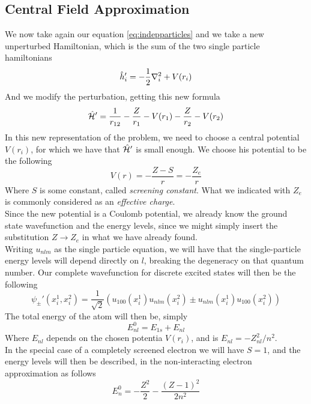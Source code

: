 \documentclass[../qm.tex]{subfiles}
\begin{document}
	\subsection{Central Field Approximation}
	We now take again our equation \eqref{eq:indepparticles} and we take a new unperturbed Hamiltonian, which is the sum of the two single particle hamiltonians
	\begin{equation}
		\hat{h}_i'=-\frac{1}{2}\nabla_i^2+V(r_i)
		\label{eq:newsingleparthamind}
	\end{equation}
	And we modify the perturbation, getting this new formula
	\begin{equation}
		\hat{\mathcal{H}}'=\frac{1}{r_{12}}-\frac{Z}{r_1}-V(r_1)-\frac{Z}{r_2}-V(r_2)
		\label{eq:newpertindel}
	\end{equation}
	In this new representation of the problem, we need to choose a central potential $V(r_i)$, for which we have that $\hat{\mathcal{H}}'$ is small enough. We choose his potential to be the following
	\begin{equation*}
		V(r)=-\frac{Z-S}{r}=-\frac{Z_e}{r}
	\end{equation*}
	Where $S$ is some constant, called \textit{screening constant}. What we indicated with $Z_e$ is commonly considered as an \textit{effective charge}.\\
	Since the new potential is a Coulomb potential, we already know the ground state wavefunction and the energy levels, since we might simply insert the substitution $Z\to Z_e$ in what we have already found.\\
	Writing $u_{nlm}$ as the single particle equation, we will have that the single-particle energy levels will depend directly on $l$, breaking the degeneracy on that quantum number. Our complete wavefunction for discrete excited states will then be the following
	\begin{equation}
		\psi_{\pm}'(x_i^1,x_i^2)=\frac{1}{\sqrt{2}}\left( u_{100}(x_i^1)u_{nlm}(x_i^2)\pm u_{nlm}(x_i^1)u_{100}(x_i^2) \right)
		\label{eq:generalpsitwononinteminus}
	\end{equation}
	The total energy of the atom will then be, simply
	\begin{equation}
		E^0_{nl}=E_{1s}+E_{nl}
	\end{equation}
	Where $E_{nl}$ depends on the chosen potentia $V(r_i)$, and is $E_{nl}=-Z_{nl}^2/n^2$.\\
	In the special case of a completely screened electron we will have $S=1$, and the energy levels will then be described, in the non-interacting electron approximation as follows
	\begin{equation}
		E_n^0=-\frac{Z^2}{2}-\frac{(Z-1)^2}{2n^2}
		\label{eq:newlevels}
	\end{equation}
\end{document}
